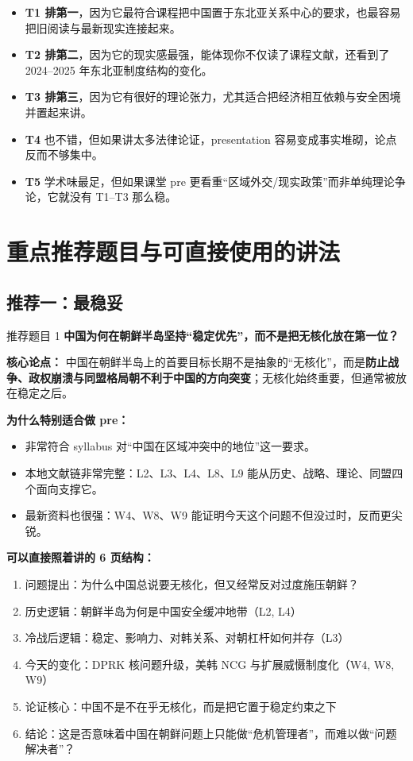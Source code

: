 \documentclass[a4paper]{article}
\begin{document}
\begin{itemize}
\item \textbf{T1 排第一}，因为它最符合课程把中国置于东北亚关系中心的要求，也最容易把旧阅读与最新现实连接起来。
\item \textbf{T2 排第二}，因为它的现实感最强，能体现你不仅读了课程文献，还看到了 2024--2025 年东北亚制度结构的变化。
\item \textbf{T3 排第三}，因为它有很好的理论张力，尤其适合把经济相互依赖与安全困境并置起来讲。
\item \textbf{T4} 也不错，但如果讲太多法律论证，presentation 容易变成事实堆砌，论点反而不够集中。
\item \textbf{T5} 学术味最足，但如果课堂 pre 更看重``区域外交/现实政策''而非单纯理论争论，它就没有 T1--T3 那么稳。
\end{itemize}

\section{重点推荐题目与可直接使用的讲法}

\subsection{推荐一：最稳妥}

\begin{findingbox}{推荐题目 1}
\textbf{中国为何在朝鲜半岛坚持``稳定优先''，而不是把无核化放在第一位？}
\end{findingbox}

\textbf{核心论点：}  
中国在朝鲜半岛上的首要目标长期不是抽象的``无核化''，而是\textbf{防止战争、政权崩溃与同盟格局朝不利于中国的方向突变}；无核化始终重要，但通常被放在稳定之后。

\textbf{为什么特别适合做 pre：}
\begin{itemize}
\item 非常符合 syllabus 对``中国在区域冲突中的地位''这一要求。
\item 本地文献链非常完整：L2、L3、L4、L8、L9 能从历史、战略、理论、同盟四个面向支撑它。
\item 最新资料也很强：W4、W8、W9 能证明今天这个问题不但没过时，反而更尖锐。
\end{itemize}

\textbf{可以直接照着讲的 6 页结构：}
\begin{enumerate}
\item 问题提出：为什么中国总说要无核化，但又经常反对过度施压朝鲜？
\item 历史逻辑：朝鲜半岛为何是中国安全缓冲地带（L2, L4）
\item 冷战后逻辑：稳定、影响力、对韩关系、对朝杠杆如何并存（L3）
\item 今天的变化：DPRK 核问题升级，美韩 NCG 与扩展威慑制度化（W4, W8, W9）
\item 论证核心：中国不是不在乎无核化，而是把它置于稳定约束之下
\item 结论：这是否意味着中国在朝鲜问题上只能做``危机管理者''，而难以做``问题解决者''？
\end{enumerate}
\end{document}
